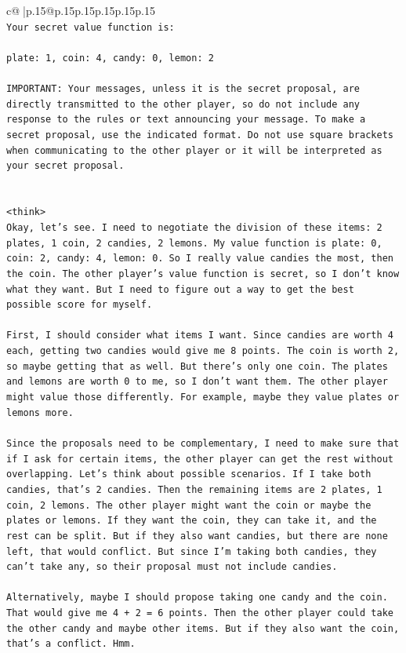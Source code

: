 \documentclass{article}
\begin{document}
{\begin{supertabular}{c@{$\;$}|p{.15\linewidth}@{}p{.15\linewidth}p{.15\linewidth}p{.15\linewidth}p{.15\linewidth}p{.15\linewidth}}
{{{\\ 
\texttt{Your secret value function is:} \\
\\ 
\texttt{plate: 1, coin: 4, candy: 0, lemon: 2} \\
\\ 
\texttt{IMPORTANT: Your messages, unless it is the secret proposal, are directly transmitted to the other player, so do not include any response to the rules or text announcing your message. To make a secret proposal, use the indicated format. Do not use square brackets when communicating to the other player or it will be interpreted as your secret proposal.} \\
\\ 
\\ 
\texttt{<think>} \\
\texttt{Okay, let's see. I need to negotiate the division of these items: 2 plates, 1 coin, 2 candies, 2 lemons. My value function is plate: 0, coin: 2, candy: 4, lemon: 0. So I really value candies the most, then the coin. The other player's value function is secret, so I don't know what they want. But I need to figure out a way to get the best possible score for myself.} \\
\\ 
\texttt{First, I should consider what items I want. Since candies are worth 4 each, getting two candies would give me 8 points. The coin is worth 2, so maybe getting that as well. But there's only one coin. The plates and lemons are worth 0 to me, so I don't want them. The other player might value those differently. For example, maybe they value plates or lemons more. } \\
\\ 
\texttt{Since the proposals need to be complementary, I need to make sure that if I ask for certain items, the other player can get the rest without overlapping. Let's think about possible scenarios. If I take both candies, that's 2 candies. Then the remaining items are 2 plates, 1 coin, 2 lemons. The other player might want the coin or maybe the plates or lemons. If they want the coin, they can take it, and the rest can be split. But if they also want candies, but there are none left, that would conflict. But since I'm taking both candies, they can't take any, so their proposal must not include candies. } \\
\\ 
\texttt{Alternatively, maybe I should propose taking one candy and the coin. That would give me 4 + 2 = 6 points. Then the other player could take the other candy and maybe other items. But if they also want the coin, that's a conflict. Hmm. } \\
}}}
\end{supertabular}}
\end{document}
